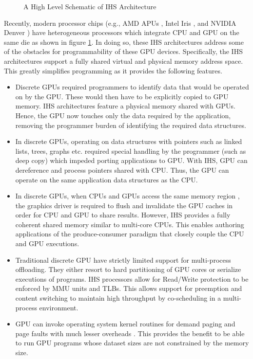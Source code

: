 \begin{figure}[!htb]
	\centering
	\def\svgwidth{\columnwidth}
	
	\caption{A High Level Schematic of IHS Architecture}
	\label{fig:ihs-schematic}
\end{figure}
\par Recently, modern processor chips (e.g., AMD APUs \cite{amd-apu}, Intel Iris \cite{inteliris}, and NVIDIA Denver \cite{denver}) have heterogeneous processors which integrate CPU and GPU on the same die as shown in figure \ref{fig:ihs-schematic}. In doing so, these IHS architectures address some of the obstacles for programmability of these GPU devices. Specifically, the IHS architectures support a fully shared virtual and physical memory address space. This greatly simplifies programming as it provides the following features.
\begin{itemize}
	\item Discrete GPUs required programmers to identify data that would be operated on by the GPU. These would then have to be explicitly copied to GPU memory. IHS architectures feature a physical memory shared with GPUs. Hence, the GPU now touches only the data required by the application, removing the programmer burden of identifying the required data structures.	
	\item In discrete GPUs, operating on data structures with pointers such as linked lists, trees, graphs etc. required special handling by the programmer (such as deep copy) which impeded porting applications to GPU. With IHS, GPU can dereference and process pointers shared with CPU. Thus, the GPU can operate on the same application data structures as the CPU.
	\item In discrete GPUs, when CPUs and GPUs access the same memory region \cite{uva}, the graphics driver is required to flush and invalidate the GPU caches in order for CPU and GPU to share results. However, IHS provides a fully coherent shared memory similar to multi-core CPUs. This enables authoring applications of the produce-consumer paradigm that closely couple the CPU and GPU executions.
	\item Traditional discrete GPU have strictly limited support for multi-process offloading. They either resort to hard partitioning of GPU cores or serialize executions of programs. IHS processors allow for Read/Write protection to be enforced by MMU units and TLBs. This allows support for preemption and content switching to maintain high throughput by co-scheduling in a multi-process environment.
	\item GPU can invoke operating system kernel routines for demand paging and page faults with much lesser overheads \cite{tlb-translation}. This provides the benefit to be able to run GPU programs whose dataset sizes are not constrained by the memory size. 

\end{itemize}
